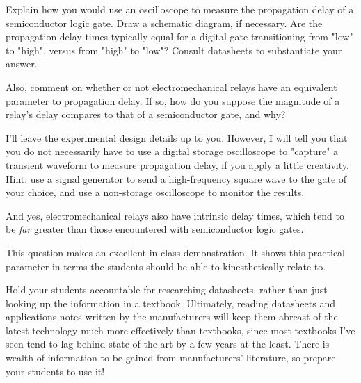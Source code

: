 

Explain how you would use an oscilloscope to measure the propagation delay of a semiconductor logic gate.  Draw a schematic diagram, if necessary.  Are the propagation delay times typically equal for a digital gate transitioning from "low" to "high", versus from "high" to "low"?  Consult datasheets to substantiate your answer.

Also, comment on whether or not electromechanical relays have an equivalent parameter to propagation delay.  If so, how do you suppose the magnitude of a relay's delay compares to that of a semiconductor gate, and why?







I'll leave the experimental design details up to you.  However, I will tell you that you do not necessarily have to use a digital storage oscilloscope to "capture" a transient waveform to measure propagation delay, if you apply a little creativity.  Hint: use a signal generator to send a high-frequency square wave to the gate of your choice, and use a non-storage oscilloscope to monitor the results.

And yes, electromechanical relays also have intrinsic delay times, which tend to be {\it far} greater than those encountered with semiconductor logic gates.







This question makes an excellent in-class demonstration.  It shows this practical parameter in terms the students should be able to kinesthetically relate to.

Hold your students accountable for researching datasheets, rather than just looking up the information in a textbook.  Ultimately, reading datasheets and applications notes written by the manufacturers will keep them abreast of the latest technology much more effectively than textbooks, since most textbooks I've seen tend to lag behind state-of-the-art by a few years at the least.  There is wealth of information to be gained from manufacturers' literature, so prepare your students to use it!

